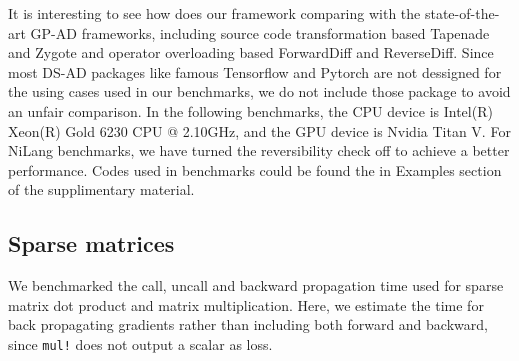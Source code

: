 \documentclass{article}
\newcommand{\<}{\langle}
\renewcommand{\>}{\rangle}
\newcommand{\ra}[1]{\renewcommand{\arraystretch}{#1}}
\theoremstyle{definition}\newtheorem{definition}{\textit{Definition}}
\begin{document}
It is interesting to see how does our framework comparing with the state-of-the-art GP-AD frameworks, including source code transformation based Tapenade and Zygote and operator overloading based ForwardDiff and ReverseDiff.
Since most DS-AD packages like famous Tensorflow and Pytorch are not dessigned for the using cases used in our benchmarks, we do not include those package to avoid an unfair comparison.
In the following benchmarks, the CPU device is Intel(R) Xeon(R) Gold 6230 CPU @ 2.10GHz, and the GPU device is Nvidia Titan V.
For NiLang benchmarks, we have turned the reversibility check off to achieve a better performance. Codes used in benchmarks could be found the in Examples section of the supplimentary material.

\subsection{Sparse matrices}\label{sec:benchsparse}
We benchmarked the call, uncall and backward propagation time used for sparse matrix dot product and matrix multiplication.
Here, we estimate the time for back propagating gradients rather than including both forward and backward, since \texttt{mul!} does not output a scalar as loss.

\begin{table}[h!]\centering
\begin{minipage}{0.8\columnwidth}
\ra{1.3}
    \caption{Absolute runtimes in seconds for computing the objectives (O) and the backward pass (B) of sparse matrix operations. The matrix size is $1000 \times 1000$, and the element density is $0.05$. The total time used in computing gradient can be estimated by summing ``O'' and ``B''.
    }\label{tbl:sparse}
\end{minipage}
\end{table}
\end{document}
